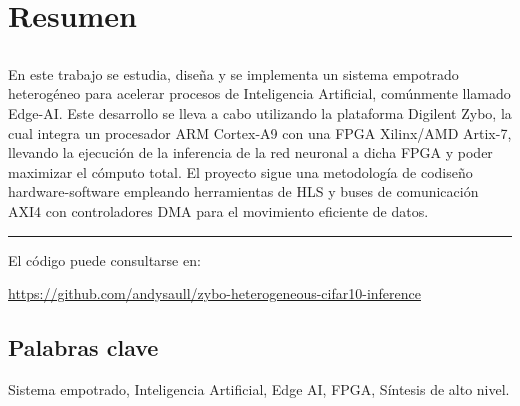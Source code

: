 \chapter*{Resumen}

\section*{\tituloPortadaVal}

En este trabajo se estudia, diseña y se implementa un sistema empotrado heterogéneo para
acelerar procesos de Inteligencia Artificial, comúnmente llamado Edge-AI.
Este desarrollo se lleva a cabo utilizando la plataforma Digilent Zybo, la cual integra
un procesador \acs{ARM} Cortex-A9 con una \acs{FPGA} Xilinx/AMD Artix-7, llevando la ejecución de la
inferencia de la red neuronal a dicha \acs{FPGA} y poder maximizar el cómputo total.
El proyecto sigue una metodología de codiseño hardware-software empleando herramientas de
\acs{HLS} y buses de comunicación \acs{AXI}4 con controladores \acs{DMA} para el
movimiento eficiente de datos.

\bigskip
\noindent\rule{\textwidth}{0.4pt}
\bigskip
El código puede consultarse en:

\url{https://github.com/andysaull/zybo-heterogeneous-cifar10-inference}

\section*{Palabras clave}

\noindent Sistema empotrado, Inteligencia Artificial, Edge AI, FPGA, Síntesis de alto nivel.
